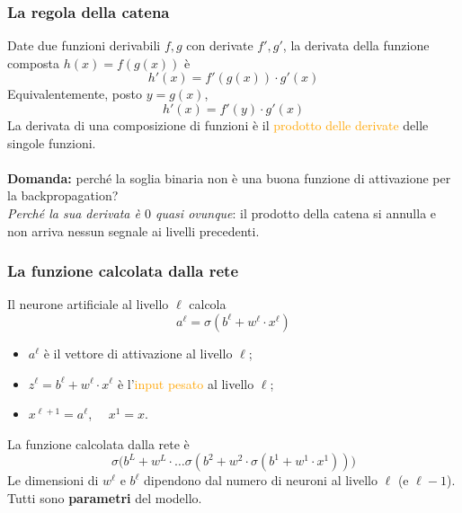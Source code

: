 \documentclass[a4paper,12pt]{article}
\newcommand{\hl}[1]{\textcolor{orange}{#1}}
\begin{document}
\subsubsection{La regola della catena}
Date due funzioni derivabili $f, g$ con derivate $f', g'$, la derivata della funzione composta $h(x) = f(g(x))$ è
\[ h'(x) = f'(g(x)) \cdot g'(x) \]
Equivalentemente, posto $y = g(x)$,
\[ h'(x) = f'(y) \cdot g'(x) \]
La derivata di una composizione di funzioni è il \hl{prodotto delle derivate} delle singole funzioni.\\
\vspace{1px}\\
\textbf{Domanda:} perché la soglia binaria non è una buona funzione di attivazione per la backpropagation?\\
\textit{Perché la sua derivata è $0$ quasi ovunque}: il prodotto della catena si annulla e non arriva nessun segnale ai livelli precedenti.

\subsubsection{La funzione calcolata dalla rete}
Il neurone artificiale al livello $\ell$ calcola
\[ a^\ell = \sigma(b^\ell + w^\ell \cdot x^\ell) \]
\begin{itemize}
\item $a^\ell$ è il vettore di attivazione al livello $\ell$;
\item $z^\ell = b^\ell + w^\ell \cdot x^\ell$ è l'\hl{input pesato} al livello $\ell$;
\item $x^{\ell+1} = a^\ell$, $\quad x^1 = x$.
\end{itemize}
La funzione calcolata dalla rete è
\[ \sigma\big(b^L + w^L \cdot \ldots \sigma(b^2 + w^2 \cdot \sigma(b^1 + w^1 \cdot x^1))\big) \]
Le dimensioni di $w^\ell$ e $b^\ell$ dipendono dal numero di neuroni al livello $\ell$ (e $\ell-1$). Tutti sono \textbf{parametri} del modello.
\end{document}
